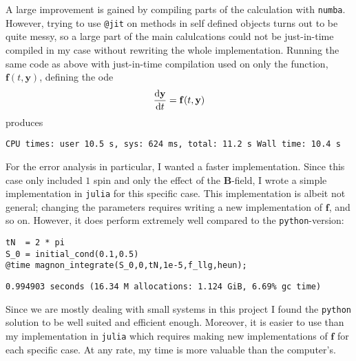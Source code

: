 A large improvement is gained by compiling parts of the calculation with \texttt{numba}. However, trying to use \texttt{@jit} on methods in self defined objects turns out to be quite messy, so a large part of the main calulcations could not be just-in-time compiled in my case without rewriting the whole implementation. Running the same code as above with just-in-time compilation used on only the function, $\mathbf{f}(t,\mathbf{y})$, defining the ode 
$$
	\frac{\text{d} \mathbf{y}}{\text{d} t} = \mathbf{f}(t,\mathbf{y})
$$	 
produces

\texttt{\small CPU times: user 10.5 s, sys: 624 ms, total: 11.2 s
Wall time: 10.4 s
}

For the error analysis in particular, I wanted a faster implementation. Since this case only included $1$ spin and only the effect of the $\mathbf{B}$-field, I wrote a simple implementation in \texttt{julia} for this specific case. This implementation is albeit not general; changing the parameters requires writing a new implementation of $\mathbf{f}$, and so on. However, it does perform extremely well compared to the \texttt{python}-version:

\begin{lstlisting}
tN  = 2 * pi
S_0 = initial_cond(0.1,0.5)
@time magnon_integrate(S_0,0,tN,1e-5,f_llg,heun);
\end{lstlisting}
\texttt{\small 0.994903 seconds (16.34 M allocations: 1.124 GiB, 6.69\% gc time)}

Since we are mostly dealing with small systems in this project I found the \texttt{python} solution to be well suited and efficient enough. Moreover, it is easier to use than my implementation in \texttt{julia} which requires making new implementations of $\mathbf{f}$ for each specific case. At any rate, my time is more valuable than the computer's. 